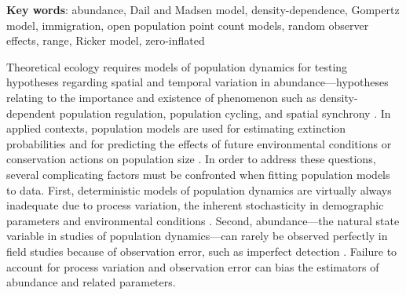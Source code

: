 \documentclass[12pt]{article}
\begin{document}
\vspace{0.5cm}

\textbf{Key words}: abundance, Dail and Madsen model, density-dependence,
Gompertz model, immigration, open population point count models,
random observer effects, range, Ricker model, zero-inflated

\newpage

Theoretical ecology requires models of population dynamics for testing
hypotheses regarding spatial and temporal variation in
abundance---hypotheses relating to the importance and existence of
phenomenon such as density-dependent population regulation, population
cycling, and spatial synchrony
\citep{royama:1977,turchin:1990,dennis_taper:1994,bjornstad_etal:1999}.
In applied contexts, population models are used for %
estimating extinction probabilities
\citep{nadeem_lele:2011} and for predicting the effects of future
environmental conditions or conservation actions on population size
\citep{jamieson_brooks:2004}.
In order to address these questions, several complicating factors must
be confronted when fitting population models to data.
First, deterministic models of population
dynamics are virtually always inadequate due to process variation,
the inherent stochasticity in demographic parameters and environmental
conditions \citep{bjornstad_grenfell:2001}. %
Second, abundance---the natural state variable in studies
of population dynamics---can rarely be observed perfectly in field
studies because of observation error, such as imperfect
detection \citep{kery_etal:2009}. Failure to account for process
variation and observation error can bias the estimators of abundance
and related parameters.
\end{document}
